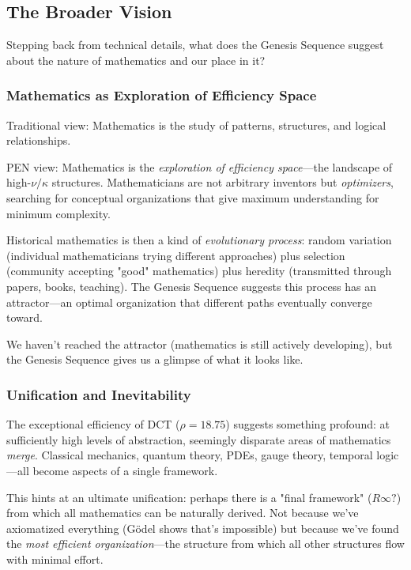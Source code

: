 \documentclass[11pt]{article}
\theoremstyle{definition}
\begin{document}
\subsection{The Broader Vision}

Stepping back from technical details, what does the Genesis Sequence suggest about the nature of mathematics and our place in it?

\subsubsection{Mathematics as Exploration of Efficiency Space}

Traditional view: Mathematics is the study of patterns, structures, and logical relationships.

PEN view: Mathematics is the \emph{exploration of efficiency space}—the landscape of high-$\nu/\kappa$ structures. Mathematicians are not arbitrary inventors but \emph{optimizers}, searching for conceptual organizations that give maximum understanding for minimum complexity.

Historical mathematics is then a kind of \emph{evolutionary process}: random variation (individual mathematicians trying different approaches) plus selection (community accepting "good" mathematics) plus heredity (transmitted through papers, books, teaching). The Genesis Sequence suggests this process has an attractor—an optimal organization that different paths eventually converge toward.

We haven't reached the attractor (mathematics is still actively developing), but the Genesis Sequence gives us a glimpse of what it looks like.

\subsubsection{Unification and Inevitability}

The exceptional efficiency of DCT ($\rho=18.75$) suggests something profound: at sufficiently high levels of abstraction, seemingly disparate areas of mathematics \emph{merge}. Classical mechanics, quantum theory, PDEs, gauge theory, temporal logic—all become aspects of a single framework.

This hints at an ultimate unification: perhaps there is a "final framework" ($R\infty ?$) from which all mathematics can be naturally derived. Not because we've axiomatized everything (Gödel shows that's impossible) but because we've found the \emph{most efficient organization}—the structure from which all other structures flow with minimal effort.
\end{document}
